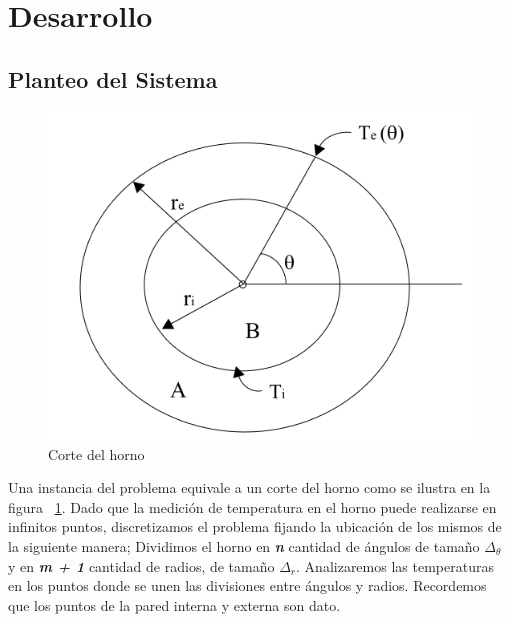 \section{Desarrollo}

\subsection{Planteo del Sistema}



\begin{figure}
  \vspace{-20pt}
  \begin{center}
    \includegraphics[scale= 0.4]{../Horno.png}
  \end{center}
  \vspace{-20pt}
  \caption{Corte del horno}
  \vspace{-10pt}
  \label{fig:corteHorno}
\end{figure}


Una instancia del problema equivale a un corte del horno como se ilustra en la figura ~\ref{fig:corteHorno}. Dado que la medición de temperatura en el horno puede realizarse en infinitos puntos, discretizamos el problema fijando la ubicación de los mismos de la siguiente manera; Dividimos el horno en \textbf{\textit{n}} cantidad de ángulos de tamaño $\Delta_{\theta}$ y en \textbf{\textit{m + 1}} cantidad de radios, de tamaño $\Delta_{r}$. Analizaremos las temperaturas en los puntos donde se unen las divisiones entre ángulos y radios. Recordemos que los puntos de la pared interna y externa son dato.\\
\\

